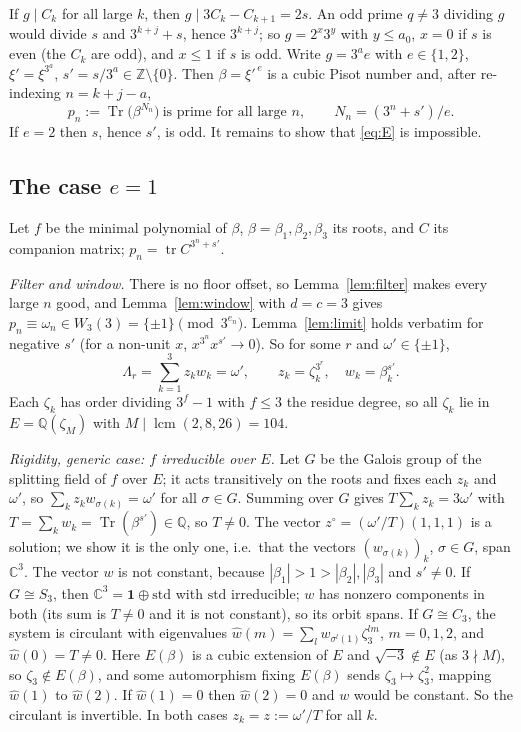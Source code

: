 \documentclass[11pt]{amsart}
\theoremstyle{definition}
\newcommand{\Z}{\mathbb{Z}}
\newcommand{\Q}{\mathbb{Q}}
\newcommand{\C}{\mathbb{C}}
\newcommand{\tr}{\operatorname{tr}}
\newcommand{\Tr}{\operatorname{Tr}}
\begin{document}
If $g\mid C_k$ for all large $k$, then $g\mid 3C_k-C_{k+1}=2s$.  An odd prime $q\neq3$ dividing $g$ would divide $s$ and $3^{k+j}+s$, hence $3^{k+j}$; so $g=2^x3^y$ with $y\le a_0$, $x=0$ if $s$ is even (the $C_k$ are odd), and $x\le1$ if $s$ is odd.  Write $g=3^ae$ with $e\in\{1,2\}$, $\xi'=\xi^{3^a}$, $s'=s/3^a\in\Z\setminus\{0\}$.  Then $\beta=\xi'^{\,e}$ is a cubic Pisot number and, after re-indexing $n=k+j-a$,
\begin{equation}\label{eq:E}
p_n:=\Tr\big(\beta^{N_n}\big)\ \text{is prime for all large }n,\qquad N_n=(3^n+s')/e .
\end{equation}
If $e=2$ then $s$, hence $s'$, is odd.  It remains to show that \eqref{eq:E} is impossible.

\subsection{The case $e=1$}
Let $f$ be the minimal polynomial of $\beta$, $\beta=\beta_1,\beta_2,\beta_3$ its roots, and $C$ its companion matrix; $p_n=\tr C^{3^n+s'}$.

\emph{Filter and window.}  There is no floor offset, so Lemma~\ref{lem:filter} makes every large $n$ good, and Lemma~\ref{lem:window} with $d=c=3$ gives $p_n\equiv\omega_n\in W_3(3)=\{\pm1\}\pmod{3^{e_n}}$.  Lemma~\ref{lem:limit} holds verbatim for negative $s'$ (for a non-unit $x$, $x^{3^n}x^{s'}\to0$).  So for some $r$ and $\omega'\in\{\pm1\}$,
\begin{equation}\label{eq:Lambda}
\Lambda_r=\sum_{k=1}^3 z_kw_k=\omega',\qquad z_k=\zeta_k^{3^r},\quad w_k=\beta_k^{s'} .
\end{equation}
Each $\zeta_k$ has order dividing $3^f-1$ with $f\le3$ the residue degree, so all $\zeta_k$ lie in $E=\Q(\zeta_M)$ with $M\mid\operatorname{lcm}(2,8,26)=104$.

\emph{Rigidity, generic case: $f$ irreducible over $E$.}  Let $G$ be the Galois group of the splitting field of $f$ over $E$; it acts transitively on the roots and fixes each $z_k$ and $\omega'$, so $\sum_kz_kw_{\sigma(k)}=\omega'$ for all $\sigma\in G$.  Summing over $G$ gives $T\sum_kz_k=3\omega'$ with $T=\sum_kw_k=\Tr(\beta^{s'})\in\Q$, so $T\neq0$.  The vector $z^\circ=(\omega'/T)(1,1,1)$ is a solution; we show it is the only one, i.e.\ that the vectors $(w_{\sigma(k)})_k$, $\sigma\in G$, span $\C^3$.  The vector $w$ is not constant, because $|\beta_1|>1>|\beta_2|,|\beta_3|$ and $s'\neq0$.  If $G\cong S_3$, then $\C^3=\mathbf 1\oplus\mathrm{std}$ with $\mathrm{std}$ irreducible; $w$ has nonzero components in both (its sum is $T\neq0$ and it is not constant), so its orbit spans.  If $G\cong C_3$, the system is circulant with eigenvalues $\hat w(m)=\sum_{l}w_{\sigma^l(1)}\zeta_3^{lm}$, $m=0,1,2$, and $\hat w(0)=T\neq0$.  Here $E(\beta)$ is a cubic extension of $E$ and $\sqrt{-3}\notin E$ (as $3\nmid M$), so $\zeta_3\notin E(\beta)$, and some automorphism fixing $E(\beta)$ sends $\zeta_3\mapsto\zeta_3^2$, mapping $\hat w(1)$ to $\hat w(2)$.  If $\hat w(1)=0$ then $\hat w(2)=0$ and $w$ would be constant.  So the circulant is invertible.  In both cases $z_k=z:=\omega'/T$ for all $k$.
\end{document}
